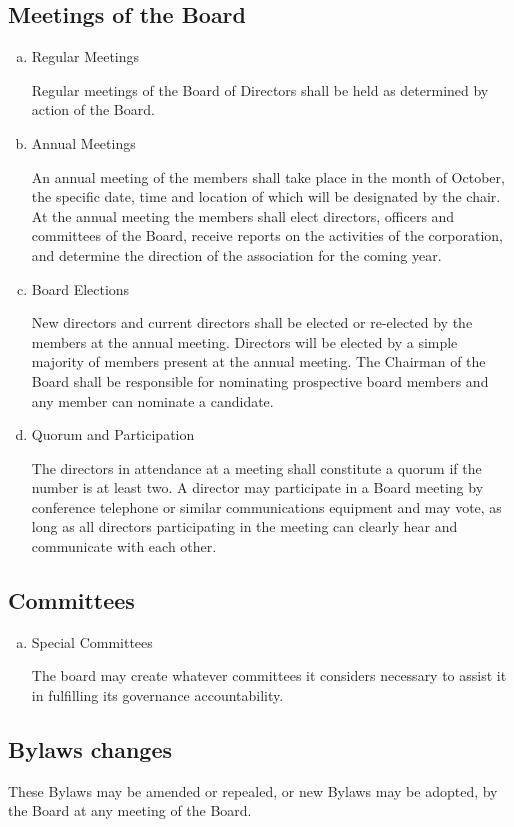 \subsection{Meetings of the Board}
\begin{enumerate}[(a)]
\item Regular Meetings

Regular meetings of the Board of Directors shall be held as determined by action of the Board.

\item Annual Meetings

An annual meeting of the members shall take place in the month of October, the specific date, time and location of which will be designated by the chair. At the annual meeting the members shall elect directors, officers and committees of the Board, receive reports on the activities of the corporation, and determine the direction of the association for the coming year.

\item Board Elections

New directors and current directors shall be elected or re-elected by the members at the annual meeting. Directors will be elected by a simple majority of members present at the annual meeting. The Chairman of the Board shall be responsible for nominating prospective board members and any member can nominate a candidate. 

\item Quorum and Participation

The directors in attendance at a meeting shall constitute a quorum if the number is at least two. A director may participate in a Board meeting by conference telephone or similar communications equipment and may vote, as long as all directors participating in the meeting can clearly hear and communicate with each other.

\end{enumerate}

\subsection{Committees}
\begin{enumerate}[(a)]
\item Special Committees

The board may create whatever committees it considers necessary to assist it in fulfilling its governance accountability.

\end{enumerate}
    
\subsection{Bylaws changes}

These Bylaws may be amended or repealed, or new Bylaws may be adopted, by the Board at any meeting of the Board.

    
    
    
    
    
    
    
    